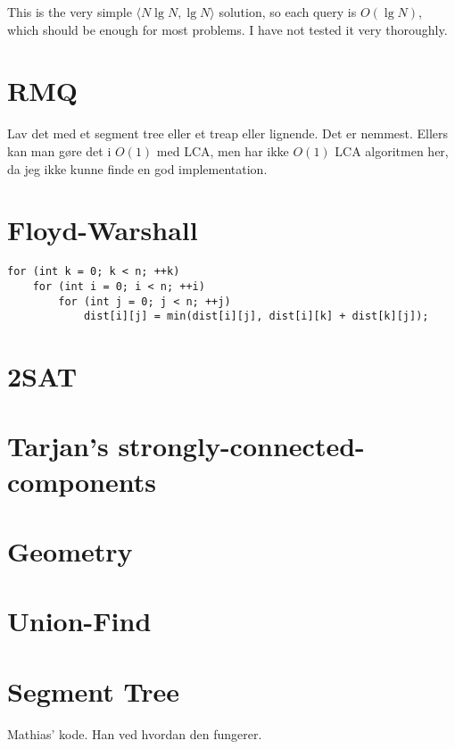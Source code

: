 \documentclass[a4paper,final,8pt]{article}
\begin{document}
This is the very simple $\langle N\lg N, \lg N\rangle$ solution, so each
query is $O(\lg N)$, which should be enough for most problems.
I have not tested it very thoroughly.




\section{RMQ}
Lav det med et segment tree eller et treap eller lignende. Det er nemmest.
Ellers kan man gøre det i $O(1)$ med LCA, men har ikke $O(1)$ LCA algoritmen
her, da jeg ikke kunne finde en god implementation.


\section{Floyd-Warshall}

\begin{lstlisting}
for (int k = 0; k < n; ++k)
    for (int i = 0; i < n; ++i)
        for (int j = 0; j < n; ++j)
            dist[i][j] = min(dist[i][j], dist[i][k] + dist[k][j]);
\end{lstlisting}

\section{2SAT}



\section{Tarjan's strongly-connected-components}



\section{Geometry}



\section{Union-Find}



\section{Segment Tree}
Mathias' kode. Han ved hvordan den fungerer.
\end{document}
